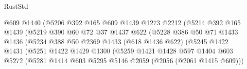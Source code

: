 \begin{lexlean}{RustStd}
\begin{coremodule}
                                  @609
                                  @1440
                                  (@5206
                                    @392
                                    @165
                                    @609
                                    @1439
                                    @1273
                                    @2212
                                    (@5214
                                      @392
                                      @165
                                      @1439
                                      (@5219
                                        @390
                                        @60
                                        @72
                                        @37
                                        @1437
                                        @622
                                        (@5228
                                          @386
                                          @50
                                          @71
                                          @1433
                                          @1436
                                          (@5234
                                            @388
                                            @50
                                            @2369
                                            @1433
                                            (@618 @1436 @622)
                                            (@5245
                                              @1422
                                              @1431
                                              (@5251
                                                @1422
                                                @1429
                                                @1300
                                                (@5259
                                                  @1421
                                                  @1428
                                                  @597
                                                  @1404
                                                  @603
                                                  @5272
                                                  (@5281
                                                    @1414
                                                    @603
                                                    @5295
                                                    @5146
                                                    @2059
                                                    (@2056 (@2061 @1415 @609)))

\end{coremodule}
\end{lexlean}
